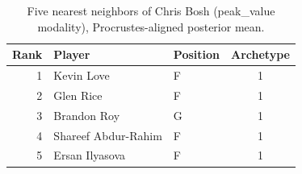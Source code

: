 \begin{table}[htbp]
  \centering\small
  \begin{tabular}{rllc}
    \toprule
    Rank & Player & Position & Archetype \\
    \midrule
    1 & Kevin Love & F & 1 \\
    2 & Glen Rice & F & 1 \\
    3 & Brandon Roy & G & 1 \\
    4 & Shareef Abdur-Rahim & F & 1 \\
    5 & Ersan Ilyasova & F & 1 \\
    \bottomrule
  \end{tabular}
  \caption{Five nearest neighbors of Chris Bosh (peak_value modality), Procrustes-aligned posterior mean.}
  \label{tab:Chris_Bosh_neighbors_peak_value}
\end{table}

